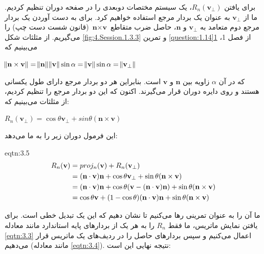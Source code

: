 {\begin{spacing}{1.5}
        برای یافتن $R_{n}(\textbf{v}_{\perp})$، یک سیستم مختصات دوبعدی را در صفحه دوران تنظیم کردیم.
        ما از $\textbf{v}_{\perp}$ به عنوان یک بردار مرجع استفاده خواهیم کرد.
        برای به دست آوردن یک بردار مرجع دوم متعامد به $\textbf{v}_{\perp}$ و $\textbf{n}$،
        حاصل ضرب متقاطع $\textbf{n}\times\textbf{v}$ (قانون شست دست چپ) را می‌گیریم. از مثلثات شکل \ref{fig:4.Session.1.3.3} و تمرین \hyperref[question:1.14]{\ref{question:1.14}1} از فصل 1، می‌بینیم که

        \begin{center}
            $\norm{\textbf{n}\times\textbf{v}}=\norm{\textbf{n}}\norm{\textbf{v}}\sin\alpha=\norm{\textbf{v}}\sin\alpha=\norm{\textbf{v}_{\perp}}$
        \end{center}

        که در آن $\alpha$ زاویه بین $\textbf{n}$ و $\textbf{v}$ است.
        بنابراین هر دو بردار مرجع دارای طول یکسانی هستند و روی دایره دوران قرار می‌گیرند.
        اکنون که این دو بردار مرجع را تنظیم کردیم، از مثلثات می‌بینیم که:

        \begin{center}
            $R_{n}(\textbf{v}_{\perp})=\cos\theta\textbf{v}_{\perp}+sin\theta(\textbf{n}\times\textbf{v})$
        \end{center}

        این فرمول دوران زیر را به ما می‌دهد:

        \begin{eqtn}{eqtn:3.5}
            \centering
            \begin{equation*}
                \centering
                \begin{split}
                    R_{n}(\textbf{v})&=proj_{n}(\textbf{v})+R_{n}(\textbf{v}_{\perp})\\
                    &=(\textbf{n}\cdot\textbf{v})\textbf{n}+\cos\theta\textbf{v}_{\perp}+\sin\theta(\textbf{n}\times\textbf{v})\\
                    &=(\textbf{n}\cdot\textbf{v})\textbf{n}+\cos\theta(\textbf{v}-(\textbf{n}\cdot\textbf{v})\textbf{n})+\sin\theta(\textbf{n}\times\textbf{v})\\
                    &=\cos\theta\textbf{v}+(1-\cos\theta)(\textbf{n}\cdot\textbf{v})\textbf{n}+\sin\theta(\textbf{n}\times\textbf{v})
                \end{split}
            \end{equation*}
        \end{eqtn}

        ما آن را به عنوان تمرینی رها می‌کنیم تا نشان دهیم که این یک تبدیل خطی است.
        برای یافتن نمایش ماتریس، ما فقط $R_{n}$ را به هر یک از بردارهای پایه استاندارد مانند معادله \ref{eqtn:3.3} اعمال می‌کنیم و سپس بردارهای حاصل را در ردیف‌های یک ماتریس قرار می‌دهیم (مانند معادله \ref{eqtn:3.4}).
        نتیجه نهایی این است:


\end{spacing}}
